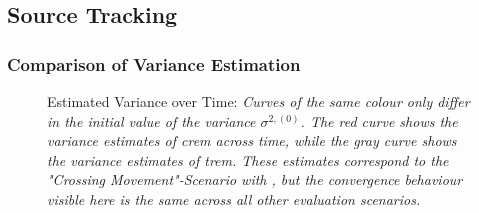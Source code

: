 
\subsection{Source Tracking}

\subsubsection{Comparison of Variance Estimation}

\begin{figure}[H]
	\setlength\figureheight{6cm}
	\setlength{}
	\iftoggle{quick}{%
		\texttt{[image: plots/tracking/variance/crossing-variance-comparison.png]}
	}{%
		
	}
	\caption[Estimated Variance over Time]{Estimated Variance over Time: \itshape Curves of the same colour only differ in the initial value of the variance $\sigma^{2,(0)}$. The red curve shows the variance estimates of \gls{crem} across time, while the gray curve shows the variance estimates of \gls{trem}. These estimates correspond to the "Crossing Movement"-Scenario with , but the convergence behaviour visible here is the same across all other evaluation scenarios.}
	\label{fig:trackVarComp}
\end{figure}

